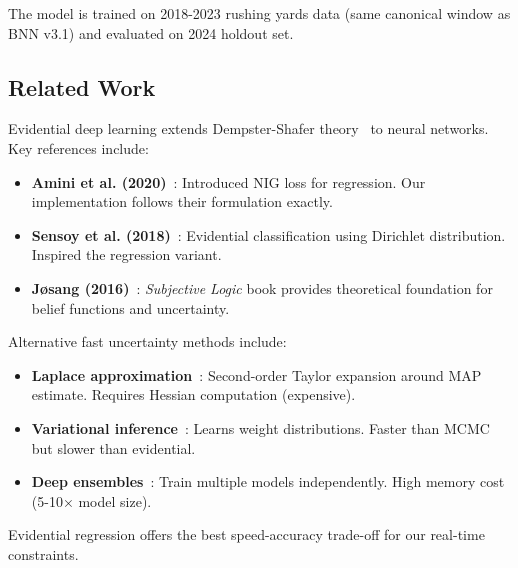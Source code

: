 The model is trained on 2018-2023 rushing yards data (same canonical window as BNN v3.1) and evaluated on 2024 holdout set.

\subsection{Related Work}

Evidential deep learning extends Dempster-Shafer theory~\citep{dempster1968generalization, shafer1976mathematical} to neural networks. Key references include:

\begin{itemize}[nosep]
    \item \textbf{Amini et al. (2020)}~\citep{amini2020deep}: Introduced NIG loss for regression. Our implementation follows their formulation exactly.
    \item \textbf{Sensoy et al. (2018)}~\citep{sensoy2018evidential}: Evidential classification using Dirichlet distribution. Inspired the regression variant.
    \item \textbf{Jøsang (2016)}~\citep{josang2016subjective}: \textit{Subjective Logic} book provides theoretical foundation for belief functions and uncertainty.
\end{itemize}

\noindent Alternative fast uncertainty methods include:
\begin{itemize}[nosep]
    \item \textbf{Laplace approximation}~\citep{mackay1992practical}: Second-order Taylor expansion around MAP estimate. Requires Hessian computation (expensive).
    \item \textbf{Variational inference}~\citep{blundell2015weight}: Learns weight distributions. Faster than MCMC but slower than evidential.
    \item \textbf{Deep ensembles}~\citep{lakshminarayanan2017simple}: Train multiple models independently. High memory cost (5-10× model size).
\end{itemize}

\noindent Evidential regression offers the best speed-accuracy trade-off for our real-time constraints.
